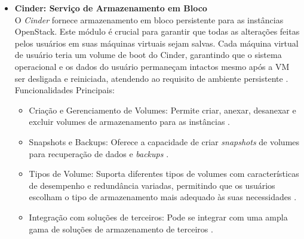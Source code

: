 \begin{itemize}
\begin{itemize}
    \item \textbf{Cinder: Serviço de Armazenamento em Bloco}\\
    O  \textit{Cinder} fornece armazenamento em bloco persistente para as instâncias OpenStack. Este módulo é crucial para garantir que todas as alterações feitas pelos usuários em suas máquinas virtuais sejam salvas. Cada máquina virtual de usuário teria um volume de boot do Cinder, garantindo que o sistema operacional e os dados do usuário permaneçam intactos mesmo após a VM ser desligada e reiniciada, atendendo ao requisito de ambiente persistente \cite{openstack2021}.\\
    Funcionalidades Principais:
    \begin{itemize}
        \item Criação e Gerenciamento de Volumes: Permite criar, anexar, desanexar e excluir volumes de armazenamento para as instâncias \cite{openstack2021}.
        \item Snapshots e Backups: Oferece a capacidade de criar  \textit{snapshots} de volumes para recuperação de dados e \textit{backups} \cite{openstack2021}.
        \item Tipos de Volume: Suporta diferentes tipos de volumes com características de desempenho e redundância variadas, permitindo que os usuários escolham o tipo de armazenamento mais adequado às suas necessidades \cite{openstack2021}.
        \item Integração com  soluções de terceiros: Pode se integrar com uma ampla gama de soluções de armazenamento de terceiros \cite{openstack2021}.
    \end{itemize}


\end{itemize}
\end{itemize}
